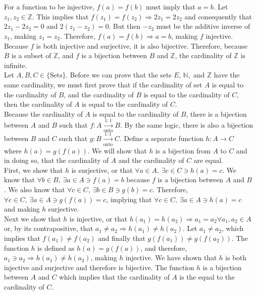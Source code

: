 \documentclass{article}
\begin{document}
\\ \\
For a function to be injective, $f(a) = f(b)$ must imply that $a = b$.  Let $z_1, z_2 \in \mathbb{Z}$. This implies that $f(z_1) = f(z_2) \Rightarrow 2z_1 = 2z_2$ and consequently that $2z_1 - 2z_2 = 0$ and $2(z_1 - z_2) = 0$. But then $-z_2$ must be the additive inverse of $z_1$, making $z_1 = z_2$. Therefore, $f(a) = f(b) \Rightarrow a = b$, making $f$ injective. Because $f$ is both injective and surjective, it is also bijective.  Therefore, because $B$ is a subset of $\mathbb{Z}$, and $f$ is a bijection between $B$ and $\mathbb{Z}$, the cardinality of $\mathbb{Z}$ is infinite.
\\[0.05in]  Let $A,B,C \in \{\text{Sets}\}$. Before we can prove that the sets $E$, $\mathbb{N}, \text{ and } \mathbb{Z}$ have the same cardinality, we must first prove that if the cardinality of set $A$ is equal to the cardinality of $B$, and the cardinality of $B$ is equal to the cardinality of $C$, then the cardinality of $A$ is equal to the cardinality of $C$.
\\[0.05in] Because the cardinality of $A$ is equal to the cardinality of $B$, there is a bijection between $A$ and $B$ such that $f:A\xrightarrow[\text{onto}]{1:1}B$. By the same logic, there is also a bijection between $B$ and $C$ such that $g:B\xrightarrow[\text{onto}]{1:1}C$. Define a separate function $h:A\rightarrow C$ where $h(a) = g(f(a))$. We will show that $h$ is a bijection from $A$ to $C$ and in doing so, that the cardinality of $A$ and the cardinality of $C$ are equal.
\\[0.05in]
First, we show that $h$ is surjective, or that $\forall a \in A, \  \exists c \in C \ni h(a) = c$. We know that $\forall b \in B, \ \exists a \in A \ni f(a) = b$ because $f$ is a bijection between $A$ and $B$.  We also know that $\forall c \in C, \ \exists b \in B \ni g(b) = c$. Therefore, $\forall c \in C,\ \exists a \in A \ni g(f(a)) = c$, implying that $\forall c \in C, \ \exists a \in A \ni h(a) = c$ and making $h$ surjective.
\\[0.05in]
Next we show that $h$ is injective, or that $h(a_1) = h(a_2) \Rightarrow a_1 = a_2 \forall a_1, a_2 \in A$ or, by its contrapositive, that $a_1 \ne a_2 \Rightarrow h(a_1) \ne h(a_2)$. Let $a_1 \ne a_2$, which implies that $f(a_1) \ne f(a_2)$ and finally that $g(f(a_1)) \ne g(f(a_2))$. The function $h$ is defined as $h(a) = g(f(a))$, and therefore, $a_1 \ni a_2 \Rightarrow h(a_1) \ne h(a_2)$, making $h$ injective. We have shown that $h$ is both injective and surjective and therefore is bijective.  The function $h$ is a bijection between $A$ and $C$ which implies that the cardinality of $A$ is the equal to the cardinality of $C$.
\end{document}
